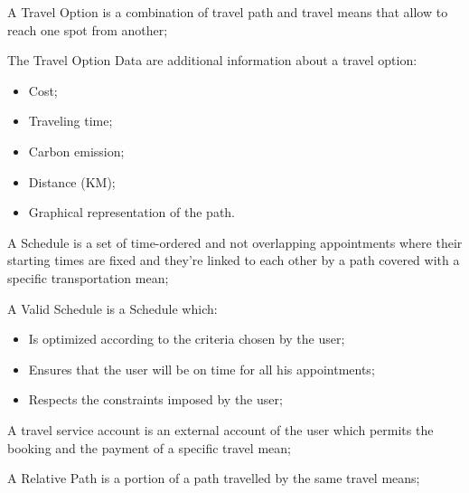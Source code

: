 \begin{definition} \label{def:travelOption}
A Travel Option is a combination of travel path and travel means that allow to reach one spot from another;
\end{definition}

\begin{definition} \label{def:travelOptionData}
The Travel Option Data are additional information about a travel option:
\begin{itemize}
\item Cost;
\item Traveling time;
\item Carbon emission;
\item Distance (KM);
\item Graphical representation of the path.

\end{itemize}
\end{definition}

\begin{definition} \label{def:schedule}
A Schedule is a set of time-ordered and not overlapping appointments where their starting times are fixed and they're linked to each other by a path covered with a specific transportation mean;
\end{definition}

\begin{definition} \label{def:validSchedule}
A Valid Schedule is a Schedule which:
\begin{itemize}
\item Is optimized according to the criteria chosen by the user;
\item Ensures that the user will be on time for all his appointments;
\item Respects the constraints imposed by the user;
\end{itemize}
\end{definition}

\begin{definition} \label{def:travelServiceAccount}
A travel service account is an external account of the user which permits the booking and the payment of a specific travel mean;
\end{definition}

\begin{definition} \label{def:relativePath}
A Relative Path is a  portion of a path travelled by the same travel means;
\end{definition}
 

